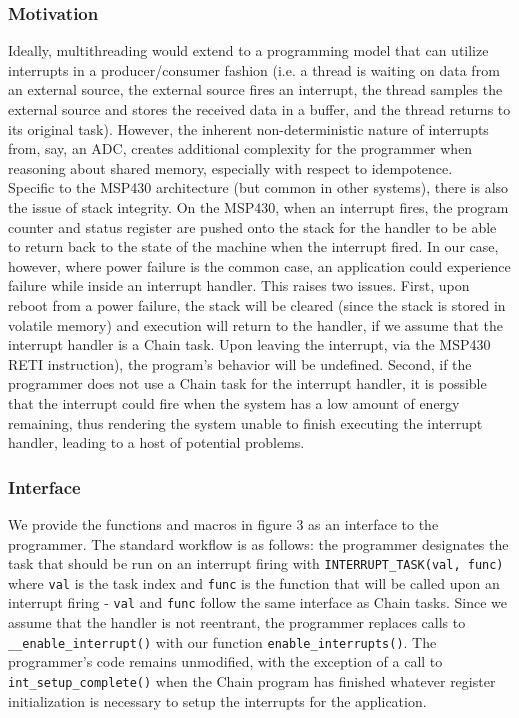 \documentclass[11pt]{sensys-proc}
\newcommand{\chain}{Chain\xspace}
\begin{document}
\subsubsection{Motivation}
Ideally, multithreading would extend to a programming model that can utilize
interrupts in a producer/consumer fashion (i.e. a thread is waiting on data
from an external source, the external source fires an interrupt, the thread
samples the external source and stores the received data in a buffer, and
the thread returns to its original task). However, the inherent
non-deterministic
nature of interrupts from, say, an ADC, creates additional complexity for the
programmer when reasoning about shared memory, especially with respect to
idempotence.\\
    Specific to the MSP430 architecture (but common in other systems), there is
also the issue of stack integrity. On the MSP430, when an interrupt fires,
the program counter and status register are pushed onto the stack for
the handler to be able to return back to the state of the machine when the
interrupt fired. In our case, however, where power failure is the common
case, an application could experience failure while inside an interrupt
handler. This raises two issues. First, upon reboot from a power failure,
the stack will be cleared (since the stack is stored in volatile memory) and
execution will return to the handler, if we assume that the interrupt handler
is a \chain task. Upon leaving the interrupt, via the MSP430 RETI instruction),
the program's behavior will be undefined. Second, if the programmer does not
use a \chain task for the interrupt handler, it is possible that the interrupt
could fire when the system has a low amount of energy remaining, thus
rendering the system unable to finish executing the interrupt handler,
leading to a host of potential problems.

\subsubsection{Interface}
We provide the functions and macros in figure 3 as an interface to
the programmer. The standard workflow is as follows: the programmer
designates the task that should be run on an interrupt firing
with \texttt{INTERRUPT\_TASK(val, func)} where \texttt{val} is the task
index and \texttt{func} is the function that will be called upon an
interrupt firing - \texttt{val} and \texttt{func} follow the same
interface as \chain tasks. Since we assume that the handler is not
reentrant, the programmer replaces calls to \texttt{\_\_enable\_interrupt()}
with our function \texttt{enable\_interrupts()}.
The programmer's code remains unmodified, with the exception of a call to
\texttt{int\_setup\_complete()} when the \chain program has finished whatever
register initialization is necessary to setup the interrupts for the
application.\\
\end{document}
